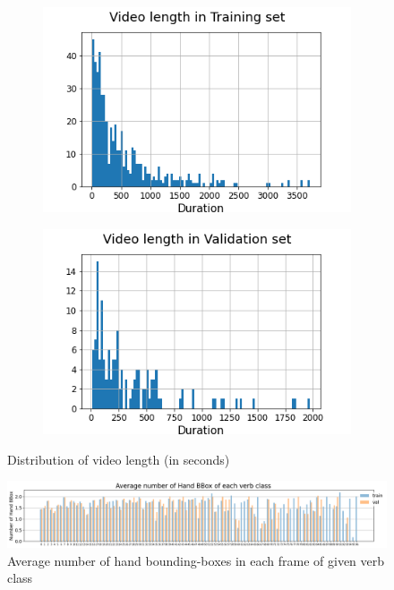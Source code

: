 \begin{figure}[ht!]
    \begin{minipage}[b]{1\textwidth}
        \begin{subfigure}[b]{0.475\textwidth}
            \centering
            \includegraphics[scale=0.4]{figures/video_length_Training.png}
        \end{subfigure}
        \begin{subfigure}[b]{0.475\textwidth}
            \centering
            \includegraphics[scale=0.4]{figures/video_length_Validation.png}
        \end{subfigure}
        \caption{Distribution of video length (in seconds)}
        \label{fig:duration}
    \end{minipage}
\end{figure}

\begin{figure}[htp!]
    \begin{minipage}[b]{1\textwidth}
        \centering
        \includegraphics[scale=0.38]{figures/avg_number_Hand_bbox_verb_class.png}
        \caption{Average number of hand bounding-boxes in each frame of given verb class}
        \label{fig:hand-bbox}
    \end{minipage}
\end{figure}

